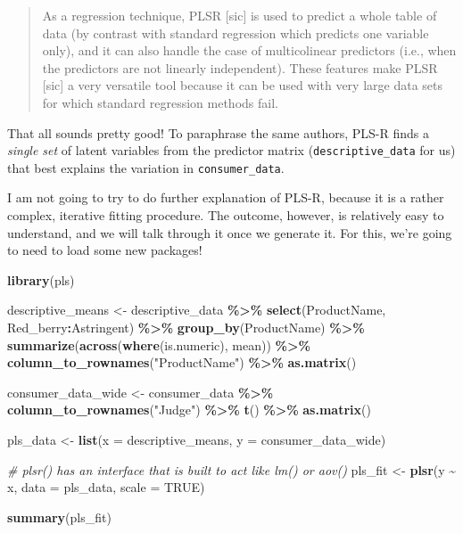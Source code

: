 \documentclass[
]{book}
\newenvironment{Shaded}{\begin{snugshade}}{\end{snugshade}}
\newcommand{\AttributeTok}[1]{\textcolor[rgb]{0.13,0.29,0.53}{#1}}
\newcommand{\CommentTok}[1]{\textcolor[rgb]{0.56,0.35,0.01}{\textit{#1}}}
\newcommand{\ConstantTok}[1]{\textcolor[rgb]{0.56,0.35,0.01}{#1}}
\newcommand{\FunctionTok}[1]{\textcolor[rgb]{0.13,0.29,0.53}{\textbf{#1}}}
\newcommand{\NormalTok}[1]{#1}
\newcommand{\OtherTok}[1]{\textcolor[rgb]{0.56,0.35,0.01}{#1}}
\newcommand{\SpecialCharTok}[1]{\textcolor[rgb]{0.81,0.36,0.00}{\textbf{#1}}}
\newcommand{\StringTok}[1]{\textcolor[rgb]{0.31,0.60,0.02}{#1}}
\begin{document}
\begin{quote}
As a regression technique, PLSR {[}sic{]} is used to predict a whole table of data (by contrast with standard regression which predicts one variable only), and it can also handle the case of multicolinear predictors (i.e., when the predictors are not linearly independent). These features make PLSR {[}sic{]} a very versatile tool because it can be used with very large data sets for which standard regression methods fail.
\end{quote}

That all sounds pretty good! To paraphrase the same authors, PLS-R finds a \emph{single set} of latent variables from the predictor matrix (\texttt{descriptive\_data} for us) that best explains the variation in \texttt{consumer\_data}.

I am not going to try to do further explanation of PLS-R, because it is a rather complex, iterative fitting procedure. The outcome, however, is relatively easy to understand, and we will talk through it once we generate it. For this, we're going to need to load some new packages!

\begin{Shaded}
\begin{Highlighting}[]
\FunctionTok{library}\NormalTok{(pls)}

\NormalTok{descriptive\_means }\OtherTok{\textless{}{-}} 
\NormalTok{  descriptive\_data }\SpecialCharTok{\%\textgreater{}\%}
  \FunctionTok{select}\NormalTok{(ProductName, Red\_berry}\SpecialCharTok{:}\NormalTok{Astringent) }\SpecialCharTok{\%\textgreater{}\%}
  \FunctionTok{group\_by}\NormalTok{(ProductName) }\SpecialCharTok{\%\textgreater{}\%}
  \FunctionTok{summarize}\NormalTok{(}\FunctionTok{across}\NormalTok{(}\FunctionTok{where}\NormalTok{(is.numeric), mean)) }\SpecialCharTok{\%\textgreater{}\%}
  \FunctionTok{column\_to\_rownames}\NormalTok{(}\StringTok{"ProductName"}\NormalTok{) }\SpecialCharTok{\%\textgreater{}\%}
  \FunctionTok{as.matrix}\NormalTok{()}

\NormalTok{consumer\_data\_wide }\OtherTok{\textless{}{-}} 
\NormalTok{  consumer\_data }\SpecialCharTok{\%\textgreater{}\%}
  \FunctionTok{column\_to\_rownames}\NormalTok{(}\StringTok{"Judge"}\NormalTok{) }\SpecialCharTok{\%\textgreater{}\%}
  \FunctionTok{t}\NormalTok{() }\SpecialCharTok{\%\textgreater{}\%}
  \FunctionTok{as.matrix}\NormalTok{()}

\NormalTok{pls\_data }\OtherTok{\textless{}{-}} 
  \FunctionTok{list}\NormalTok{(}\AttributeTok{x =}\NormalTok{ descriptive\_means,}
       \AttributeTok{y =}\NormalTok{ consumer\_data\_wide)}

\CommentTok{\# \textasciigrave{}plsr()\textasciigrave{} has an interface that is built to act like \textasciigrave{}lm()\textasciigrave{} or \textasciigrave{}aov()\textasciigrave{}}
\NormalTok{pls\_fit }\OtherTok{\textless{}{-}} 
  \FunctionTok{plsr}\NormalTok{(y }\SpecialCharTok{\textasciitilde{}}\NormalTok{ x, }
       \AttributeTok{data =}\NormalTok{ pls\_data, }
       \AttributeTok{scale =} \ConstantTok{TRUE}\NormalTok{)}

\FunctionTok{summary}\NormalTok{(pls\_fit)}
\end{Highlighting}
\end{Shaded}
\end{document}
